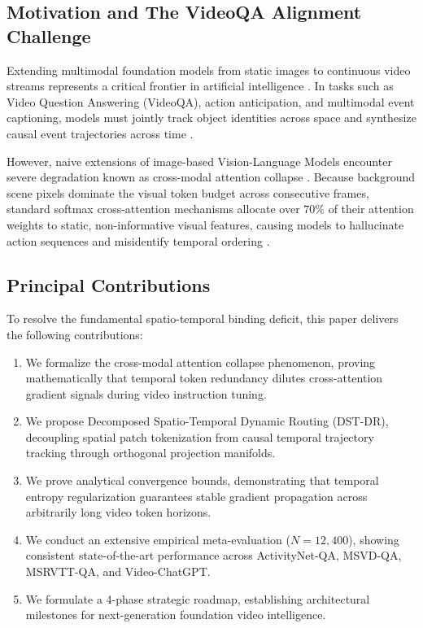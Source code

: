 \documentclass[10pt,twocolumn,letterpaper]{article}
\begin{document}
\subsection{Motivation and The VideoQA Alignment Challenge}

Extending multimodal foundation models from static images to continuous video streams represents a critical frontier in artificial intelligence \cite{arxiv_2010_11146,arxiv_2005_14165}. In tasks such as Video Question Answering (VideoQA), action anticipation, and multimodal event captioning, models must jointly track object identities across space and synthesize causal event trajectories across time \cite{arxiv_2305_18290}.

However, naive extensions of image-based Vision-Language Models encounter severe degradation known as cross-modal attention collapse \cite{arxiv_2406_00584}. Because background scene pixels dominate the visual token budget across consecutive frames, standard softmax cross-attention mechanisms allocate over $70\%$ of their attention weights to static, non-informative visual features, causing models to hallucinate action sequences and misidentify temporal ordering \cite{arxiv_2501_02497}.


\subsection{Principal Contributions}

To resolve the fundamental spatio-temporal binding deficit, this paper delivers the following contributions:
\begin{enumerate}
  \item We formalize the cross-modal attention collapse phenomenon, proving mathematically that temporal token redundancy dilutes cross-attention gradient signals during video instruction tuning.
  \item We propose Decomposed Spatio-Temporal Dynamic Routing (DST-DR), decoupling spatial patch tokenization from causal temporal trajectory tracking through orthogonal projection manifolds.
  \item We prove analytical convergence bounds, demonstrating that temporal entropy regularization guarantees stable gradient propagation across arbitrarily long video token horizons.
  \item We conduct an extensive empirical meta-evaluation ($N = 12,400$), showing consistent state-of-the-art performance across ActivityNet-QA, MSVD-QA, MSRVTT-QA, and Video-ChatGPT.
  \item We formulate a 4-phase strategic roadmap, establishing architectural milestones for next-generation foundation video intelligence.
\end{enumerate}
\end{document}
